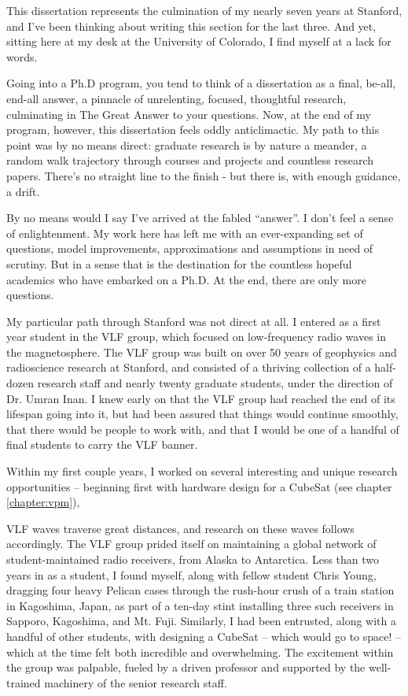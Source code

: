 This dissertation represents the culmination of my nearly seven years at Stanford, and I've been thinking about writing this section for the last three. And yet, sitting here at my desk at the University of Colorado, I find myself at a lack for words.

Going into a Ph.D program, you tend to think of a dissertation as a final, be-all, end-all answer, a pinnacle of unrelenting, focused, thoughtful research, culminating in The Great Answer to your questions. Now, at the end of my program, however, this dissertation feels oddly anticlimactic. My path to this point was by no means direct: graduate research is by nature a meander, a random walk trajectory through courses and projects and countless research papers. There's no straight line to the finish - but there is, with enough guidance, a drift. 

By no means would I say I've arrived at the fabled ``answer''. I don't feel a sense of enlightenment. My work here has left me with an ever-expanding set of questions, model improvements, approximations and assumptions in need of scrutiny. But in a sense that is the destination for the countless hopeful academics who have embarked on a Ph.D. At the end, there are only more questions.

My particular path through Stanford was not direct at all. I entered as a first year student in the VLF group, which focused on low-frequency radio waves in the magnetosphere. The VLF group was built on over 50 years of geophysics and radioscience research at Stanford, and consisted of a thriving collection of a half-dozen research staff and nearly twenty graduate students, under the direction of Dr. Umran Inan. I knew early on that the VLF group had reached the end of its lifespan going into it, but had been assured that things would continue smoothly, that there would be people to work with, and that I would be one of a handful of final students to carry the VLF banner.

Within my first couple years, I worked on several interesting and unique research opportunities -- beginning first with hardware design for a CubeSat (see chapter \ref{chapter:vpm}),

VLF waves traverse great distances, and research on these waves follows accordingly. The VLF group prided itself on maintaining a global network of student-maintained radio receivers, from Alaska to Antarctica. Less than two years in as a student, I found myself, along with fellow student Chris Young, dragging four heavy Pelican cases through the rush-hour crush of a train station in Kagoshima, Japan, as part of a ten-day stint installing three such receivers in Sapporo, Kagoshima, and Mt. Fuji. Similarly, I had been entrusted, along with a handful of other students, with designing a CubeSat -- which would go to space! -- which at the time felt both incredible and overwhelming. The excitement within the group was palpable, fueled by a driven professor and supported by the well-trained machinery of the senior research staff.

